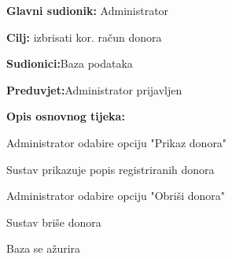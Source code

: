 \noindent {}
\begin{packed_item}
	
	\item \textbf{Glavni sudionik: }{Administrator}
	\item  \textbf{Cilj:} {izbrisati kor. račun donora}
	\item  \textbf{Sudionici:}{Baza podataka}
	\item  \textbf{Preduvjet:}{Administrator prijavljen}
	\item  \textbf{Opis osnovnog tijeka:}
	
	\item[] \begin{packed_enum}
		
		\item {Administrator odabire opciju "Prikaz donora"}
		\item {Sustav prikazuje popis registriranih donora} 
		\item {Administrator odabire opciju "Obriši donora"}
		\item {Sustav briše donora}
		\item {Baza se ažurira}
	\end{packed_enum}
	
\end{packed_item}


\noindent {}

